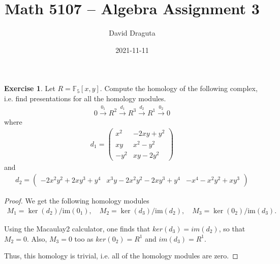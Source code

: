 \documentclass[12pt]{extarticle}
\title{ Math 5107 -- Algebra Assignment 3}
\author{David Draguta}
\date{2021-11-11}
\newcommand{\im}{\text{im}}
\newcommand{\<}{\langle}
\renewcommand{\>}{\rangle}
\theoremstyle{definition}
\newtheorem{exercise}{Exercise}
\begin{document}
\maketitle

\begin{exercise}
  Let $R = \mathbb{F}_5[x,y]$. Compute the homology of the following complex, i.e. find presentations for all the homology modules.
  \begin{align*}
    0 \xrightarrow{0_1} R^2 \xrightarrow{d_1} R^3 \xrightarrow{d_2} R^1 \xrightarrow{0_2} 0 
  \end{align*}
  where
  \begin{align*}
    d_1 = 
    \begin{pmatrix}
      x^2  & -2xy+y^2 \\
      xy   & x^2 - y^2 \\
      -y^2 & xy - 2y^2 
    \end{pmatrix}
  \end{align*}
  and
    \begin{align*}
    d_2 = 
    \begin{pmatrix}
      -2x^2y^2+2xy^3+y^4 & x^3y-2x^2y^2-2xy^3+y^4 & -x^4-x^2y^2+xy^3
    \end{pmatrix}
  \end{align*}
\end{exercise}
\begin{proof}
  We get the following homology modules
  \begin{align*}
    M_1 = \ker(d_2)/\im(0_1), \quad M_2 = \ker(d_3)/\im(d_2), \quad M_3 = \ker(0_2)/\im(d_3).
  \end{align*}

  Using the Macaulay2 calculator, one finds that $ker(d_3) = im(d_2)$, so that $M_2 = 0$. Also, $M_3 = 0$ too as $ker(0_2)=R^1$ and $im(d_3) = R^1$.

  Thus, this homology is trivial, i.e. all of the homology modules are zero. 

\end{proof}
\end{document}
